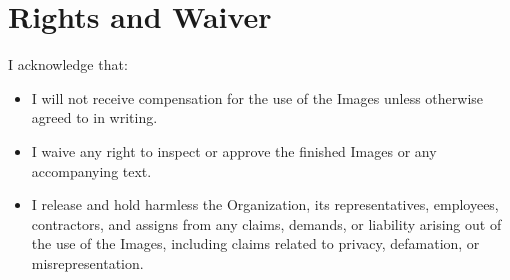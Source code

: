 
\section{Rights and Waiver}
\label{sec:rights}

I acknowledge that:
\begin{itemize}
  \item I will not receive compensation for the use of the Images unless otherwise agreed to in writing.
  \item I waive any right to inspect or approve the finished Images or any accompanying text.
  \item I release and hold harmless the Organization, its representatives, employees, contractors, and assigns from any claims, demands, or liability arising out of the use of the Images, including claims related to privacy, defamation, or misrepresentation.
\end{itemize}

